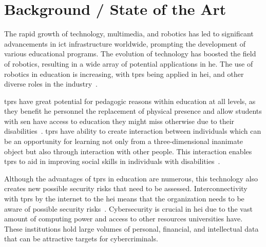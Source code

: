 
\newpage


\section{Background / State of the Art}

The rapid growth of technology, multimedia, and robotics has led to significant advancements in \ac{ict} infrastructure worldwide, prompting
the development of various educational programs. The evolution of technology has boosted the field of robotics, resulting in a wide array
of potential applications in \ac{he}. The use of robotics in education is increasing,
with \ac{tprs} being applied in \ac{hei}, and other diverse roles in the industry~\cite[]{telepresence_robots_in_classroom_2019,higher_edu_perception_on_tprs_2022}.

\ac{tprs} have great potential for pedagogic reasons within education at all levels, as they benefit \ac{he} personnel the replacement of
physical
presence and allow students with \ac{sen} have access to education they might miss otherwise due to their disabilities~\cite[546]{telepresence_robots_in_classroom_2019}.
\ac{tprs} have ability to create interaction between individuals which can be an opportunity for learning not only from a three-dimensional
inanimate
object but also through interaction with other people. This interaction enables \ac{tprs} to aid in improving social
skills in individuals with disabilities~\cite[541]{telepresence_robots_in_classroom_2019}.

Although the advantages of \ac{tprs} in education are numerous, this technology also creates new possible security risks that need to be
assessed. Interconnectivity with \ac{tprs} by the internet to the \ac{hei} means that the organization needs to be aware of possible
security risks~\cite[120]{robotics_cyber_security_2022}. Cybersecurity is crucial in \ac{hei} due to the vast amount of computing power and access to other resources
universities
have. These institutions hold large volumes of personal, financial, and intellectual data that can be attractive targets for cybercriminals.

